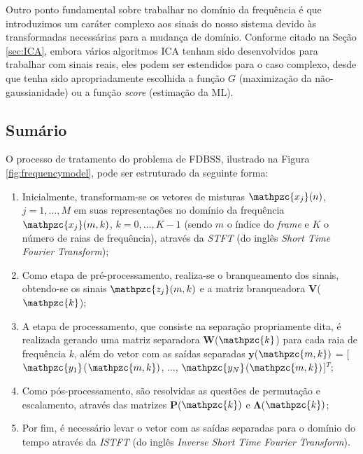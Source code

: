         Outro ponto fundamental sobre trabalhar no domínio da frequência é que introduzimos um caráter complexo aos sinais do nosso sistema devido às transformadas necessárias para a mudança de domínio. Conforme citado na Seção \ref{sec:ICA}, embora vários algoritmos ICA tenham sido desenvolvidos para trabalhar com sinais reais, eles podem ser estendidos para o caso complexo, desde que tenha sido apropriadamente escolhida a função $G$ (maximização da não-gaussianidade) ou a função \textit{score} (estimação da ML). 
        
    \subsection{Sumário}
        O processo de tratamento do problema de FDBSS, ilustrado na Figura \ref{fig:frequencymodel}, pode ser estruturado da seguinte forma:
        
        \begin{enumerate}
            \item Inicialmente, transformam-se os vetores de misturas $\mathpzc{x_j}(n)$, $j = 1,\dots,M$ em suas representações no domínio da frequência $\mathpzc{x_j}(m,k)$, $k = 0, \dots, K-1$ (sendo $m$ o índice do \textit{frame} e $K$ o número de raias de frequência), através da \textit{STFT} (do inglês \textit{Short Time Fourier Transform});
            
            \item Como etapa de pré-processamento, realiza-se o branqueamento dos sinais, obtendo-se os sinais $\mathpzc{z_j}(m,k)$ e a matriz branqueadora $\mathbf{V}$($\mathpzc{k}$);
            
            \item A etapa de processamento, que consiste na separação propriamente dita, é realizada gerando uma matriz separadora $\mathbf{W}$($\mathpzc{k}$) para cada raia de frequência $k$, além do vetor com as saídas separadas $\mathbf{y}$($\mathpzc{m,k})$ = [$\mathpzc{y_1}$($\mathpzc{m,k})$, $\dots$, $\mathpzc{y_N}$($\mathpzc{m,k})$]$^T$;
            
            \item Como pós-processamento, são resolvidas as questões de permutação e escalamento, através das matrizes $\mathbf{P}$($\mathpzc{k})$ e $\mathbf{\Lambda}$($\mathpzc{k})$;
            
            \item Por fim, é necessário levar o vetor com as saídas separadas para o domínio do tempo através da \textit{ISTFT} (do inglês \textit{Inverse Short Time Fourier Transform}).
            
        \end{enumerate}

